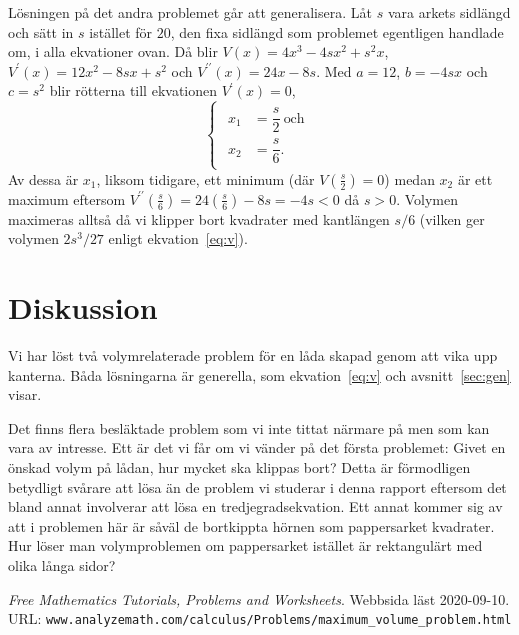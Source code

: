 \documentclass[a4paper,12pt]{article}
\begin{document}
Lösningen på det andra problemet går att generalisera. Låt $s$ vara
arkets sidlängd och sätt in $s$ istället för $20$, den fixa 
sidlängd som problemet egentligen handlade om, i alla ekvationer
ovan. Då blir
%
  $V(x)                = 4x^3  - 4sx^2   + s^2x$,
%
  $V^\prime(x)         = 12x^2 - 8sx+s^2$ och
%
  $V^{\prime\prime}(x) = 24x   - 8s$.
%
Med $a = 12$, $b = -4sx$ och $c = s^2$ blir rötterna till
ekvationen $V^\prime(x) = 0$, 
%
\begin{displaymath}
%
  \begin{cases}
%    
    \begin{aligned}
      x_1 &= \dfrac{s}{2} ~ \text{och}\\
      x_2 &= \dfrac{s}{6}.
    \end{aligned}
%
  \end{cases}
%
\end{displaymath}
%
Av dessa är $x_1$, liksom tidigare, ett minimum (där $V(\frac{s}{2}) = 0$)
medan $x_2$ är ett maximum eftersom
  $V^{\prime\prime}(\frac{s}{6}) = 24(\frac{s}{6}) - 8s
                                 = -4s
				 < 0$
då $s > 0$. Volymen maximeras alltså då vi klipper bort kvadrater med
kantlängen $s / 6$ (vilken ger volymen $2s^3/27$ enligt
ekvation~\ref{eq:v}). 


\section{Diskussion}


Vi har löst två volymrelaterade problem för en låda skapad genom att
vika upp kanterna. Båda lösningarna är generella, som
ekvation~\ref{eq:v} och avsnitt~\ref{sec:gen} visar. 


Det finns flera besläktade problem som vi inte tittat närmare på men
som kan vara av intresse. Ett är det vi får om vi vänder på det första
problemet: Givet en önskad volym på lådan, hur mycket ska klippas
bort? Detta är förmodligen betydligt svårare att lösa än de problem vi
studerar i denna rapport eftersom det bland annat involverar att lösa
en tredjegradsekvation. Ett annat kommer sig av att i problemen här är
såväl de bortkippta hörnen som pappersarket kvadrater. Hur löser man
volymproblemen om pappersarket istället är rektangulärt med olika
långa sidor?  
%
\begin{thebibliography}{99}
%
   \emph{Free Mathematics Tutorials, Problems and
    Worksheets}. Webbsida läst 2020-09-10. URL: 
  \texttt{www.analyzemath.com/calculus/Problems/maximum\_volume\_problem.html}
%
\end{thebibliography}
%
\end{document}
